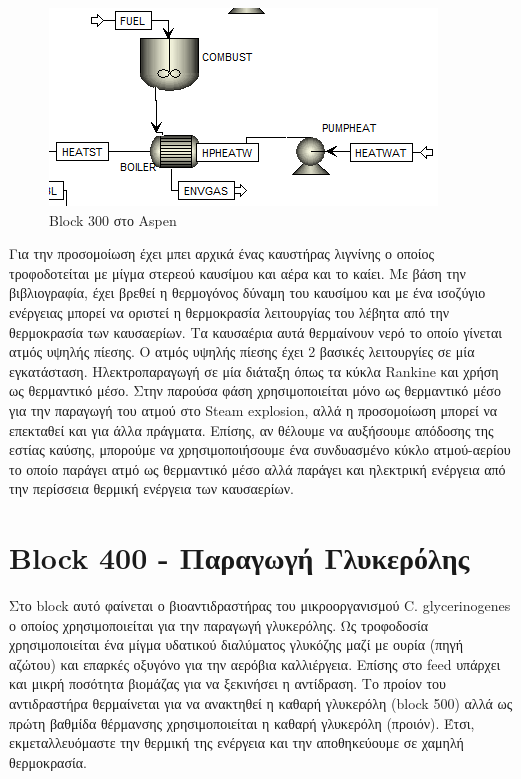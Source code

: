 \documentclass[11pt]{article}
\begin{document}
\begin{figure}[htbp]
\centering
\includegraphics[width=.9\linewidth]{Block_300_-_Λέβητας_Καύσης_Λιγνίνης/2023-01-10_18-51-18_screenshot.png}
\caption{Block 300 στο Aspen}
\end{figure}

Για την προσομοίωση έχει μπει αρχικά ένας καυστήρας λιγνίνης ο οποίος τροφοδοτείται με μίγμα στερεού καυσίμου και αέρα και το καίει. Με βάση την βιβλιογραφία, έχει βρεθεί η θερμογόνος δύναμη του καυσίμου και με ένα ισοζύγιο ενέργειας μπορεί να οριστεί η θερμοκρασία λειτουργίας του λέβητα από την θερμοκρασία των καυσαερίων. Τα καυσαέρια αυτά θερμαίνουν νερό το οποίο γίνεται ατμός υψηλής πίεσης. Ο ατμός υψηλής πίεσης έχει 2 βασικές λειτουργίες σε μία εγκατάσταση. Ηλεκτροπαραγωγή σε μία διάταξη όπως τα κύκλα Rankine και χρήση ως θερμαντικό μέσο. Στην παρούσα φάση χρησιμοποιείται μόνο ως θερμαντικό μέσο για την παραγωγή του ατμού στο Steam explosion, αλλά η προσομοίωση μπορεί να επεκταθεί και για άλλα πράγματα. Επίσης, αν θέλουμε να αυξήσουμε απόδοσης της εστίας καύσης, μπορούμε να χρησιμοποιήσουμε ένα συνδυασμένο κύκλο ατμού-αερίου το οποίο παράγει ατμό ως θερμαντικό μέσο αλλά παράγει και ηλεκτρική ενέργεια από την περίσσεια θερμική ενέργεια των καυσαερίων.

\section{Block 400 - Παραγωγή Γλυκερόλης}
\label{sec:org5a9c9e7}
Στο block αυτό φαίνεται ο βιοαντιδραστήρας του μικροοργανισμού C. glycerinogenes ο οποίος χρησιμοποιείται για την παραγωγή γλυκερόλης. Ως τροφοδοσία χρησιμοποιείται ένα μίγμα υδατικού διαλύματος γλυκόζης μαζί με ουρία (πηγή αζώτου) και επαρκές οξυγόνο για την αερόβια καλλιέργεια. Επίσης στο feed υπάρχει και μικρή ποσότητα βιομάζας για να ξεκινήσει η αντίδραση. Το προίον του αντιδραστήρα θερμαίνεται για να ανακτηθεί η καθαρή γλυκερόλη (block 500) αλλά ως πρώτη βαθμίδα θέρμανσης χρησιμοποιείται η καθαρή γλυκερόλη (προιόν). Έτσι, εκμεταλλευόμαστε την θερμική της ενέργεια και την αποθηκεύουμε σε χαμηλή θερμοκρασία.
\end{document}

